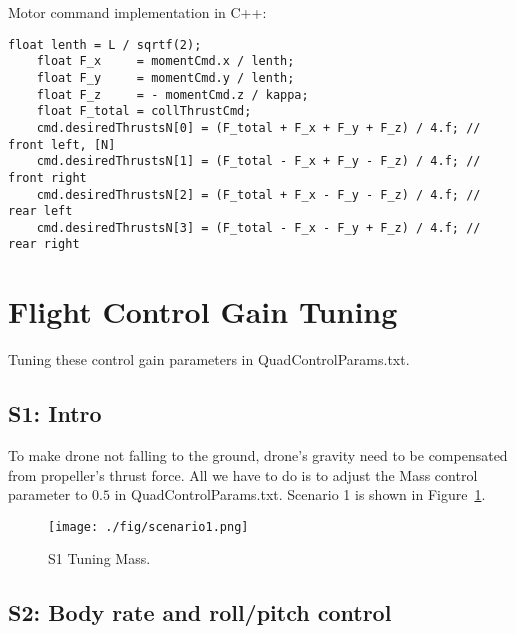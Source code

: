 \documentclass[letterpaper]{article}
\begin{document}
Motor command implementation in C++:
\begin{lstlisting}[frame=single]
    float lenth = L / sqrtf(2);
    float F_x     = momentCmd.x / lenth;
    float F_y     = momentCmd.y / lenth;
    float F_z     = - momentCmd.z / kappa;
    float F_total = collThrustCmd;
    cmd.desiredThrustsN[0] = (F_total + F_x + F_y + F_z) / 4.f; // front left, [N]
    cmd.desiredThrustsN[1] = (F_total - F_x + F_y - F_z) / 4.f; // front right
    cmd.desiredThrustsN[2] = (F_total + F_x - F_y - F_z) / 4.f; // rear left
    cmd.desiredThrustsN[3] = (F_total - F_x - F_y + F_z) / 4.f; // rear right
\end{lstlisting}

\section{Flight Control Gain Tuning}

Tuning these control gain parameters in QuadControlParams.txt.

\subsection{S1: Intro}

To make drone not falling to the ground, drone's gravity need to be compensated from propeller's thrust force. All we have to do is to adjust the Mass control parameter to $0.5$ in QuadControlParams.txt. Scenario 1 is shown in Figure~\ref{fig:scenario1}.

\begin{figure}[ht]
\centering
\texttt{[image: ./fig/scenario1.png]}
\caption{\label{fig:scenario1} S1 Tuning Mass.}
\end{figure}

\subsection{S2: Body rate and roll/pitch control}
\end{document}
